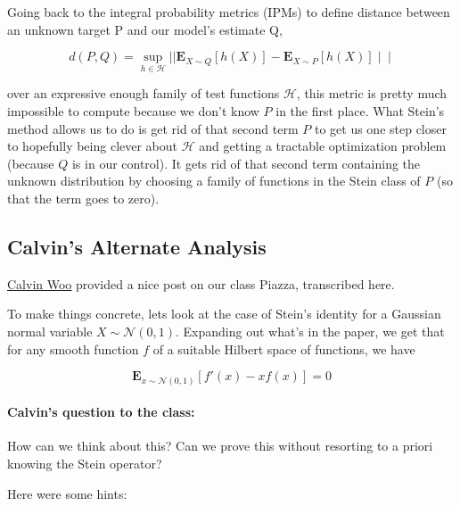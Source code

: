 \documentclass[12pt]{article}
\begin{document}
\noindent Going back to the integral probability metrics (IPMs) to define distance between an unknown target P and our model's estimate Q,

\begin{equation}
    d(P,Q) = \sup_{h \in \mathcal{H}} || \mathbf{E}_{X \sim Q}[h(X)] - \mathbf{E}_{X \sim P}[h(X)] ∣∣
\end{equation}

\noindent over an expressive enough family of test functions $\mathcal{H}$, this metric is pretty much impossible to compute because we don't know $P$ in the first place. What Stein's method allows us to do is get rid of that second term $P$ to get us one step closer to hopefully being clever about $\mathcal{H}$ and getting a tractable optimization problem (because $Q$ is in our control). It gets rid of that second term containing the unknown distribution by choosing a family of functions in the Stein class of $P$ (so that the term goes to zero).

\subsection{Calvin's Alternate Analysis}

\href{https://calwoo.github.io}{Calvin Woo} provided a nice post on our class Piazza, transcribed here.

To make things concrete, lets look at the case of Stein's identity for a Gaussian normal variable $X \sim \mathcal{N}(0,1)$. Expanding out what's in the paper, we get that for any smooth function $f$ of a suitable Hilbert space of functions, we have

\begin{equation}
    \mathbf{E}_{x \sim \mathcal{N}(0,1)}[f'(x) - xf(x)]=0
\end{equation} 

\paragraph{Calvin's question to the class:} How can we think about this? Can we prove this without resorting to a priori knowing the Stein operator?

Here were some hints:
\end{document}
